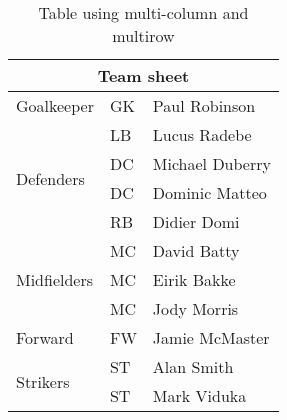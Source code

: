 \begin{table}[h]
\caption{Table using multi-column and multirow\label{tab:help4}}
\centering
\begin{tabular}{|l|l|l|}
\hline
\multicolumn{3}{|c|}{Team sheet} \\
\hline
Goalkeeper & GK & Paul Robinson \\ \hline
\multirow{4}{*}{Defenders} & LB & Lucus Radebe \\
 & DC & Michael Duberry \\
 & DC & Dominic Matteo \\
 & RB & Didier Domi \\ \hline
\multirow{3}{*}{Midfielders} & MC & David Batty \\
 & MC & Eirik Bakke \\
 & MC & Jody Morris \\ \hline
Forward & FW & Jamie McMaster \\ \hline
\multirow{2}{*}{Strikers} & ST & Alan Smith \\
 & ST & Mark Viduka \\
\hline
\end{tabular}
\end{table}




